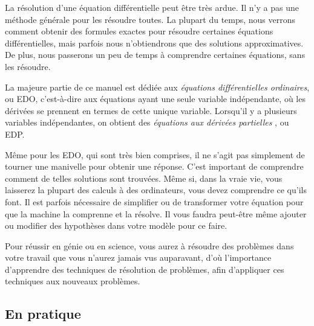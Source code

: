 La résolution d'une équation différentielle peut être très ardue.  Il n'y a pas une méthode générale pour les résoudre toutes. La plupart du temps, nous verrons comment obtenir des formules exactes pour résoudre certaines équations différentielles, mais parfois nous n'obtiendrons que des solutions approximatives. De plus, nous passerons un peu de temps à comprendre certaines équations, sans les résoudre.

La majeure partie de ce manuel est dédiée aux 
\emph{équations différentielles ordinaires},
ou EDO, c'est-à-dire aux équations ayant une seule variable indépendante, où les dérivées se prennent en termes de cette unique variable.  Lorsqu'il y a plusieurs variables indépendantes, on obtient des 
\emph{équations aux dérivées partielles },
ou EDP.

Même pour les EDO, qui sont très bien comprises, il ne s'agit pas simplement de tourner une manivelle pour obtenir une réponse.  
  C'est important de comprendre comment de telles solutions sont trouvées.  Même si, dans la vraie vie, vous laisserez la plupart des calculs à des ordinateurs, vous devez comprendre ce qu'ils font.  Il est parfois nécessaire de simplifier ou de transformer votre équation pour que la machine la comprenne et la résolve.  Il vous faudra peut-être même ajouter ou modifier des hypothèses dans votre modèle pour ce faire.
  
Pour réussir en génie ou en science, vous aurez à résoudre des problèmes dans votre travail que vous n'aurez jamais vus auparavant, d'où l'importance d'apprendre des techniques de résolution de problèmes, afin d'appliquer ces techniques aux nouveaux problèmes.  
 
\subsection{En pratique}
\begin{myfig}
\end{myfig}

